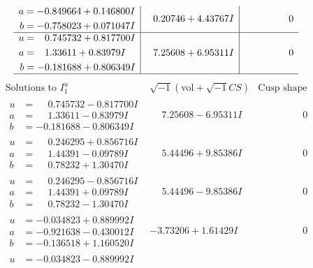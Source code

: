 \documentclass[1p]{elsarticle_modified}
\theoremstyle{definition}
\newcommand{\I}{\sqrt{-1}}
\begin{document}
$$\begin{array}{c|c|c}
\begin{aligned}
a &= -0.849664 + 0.146800 I \\
b &= -0.758023 + 0.071047 I\end{aligned}
 & \phantom{-}0.20746 + 4.43767 I & \phantom{-0.000000 } 0 \\ \hline\begin{aligned}
u &= \phantom{-}0.745732 + 0.817700 I \\
a &= \phantom{-}1.33611 + 0.83979 I \\
b &= -0.181688 + 0.806349 I\end{aligned}
 & \phantom{-}7.25608 + 6.95311 I & \phantom{-0.000000 } 0\\
 \hline 
 \end{array}$$\newpage$$\begin{array}{c|c|c}  
\text{Solutions to }I^u_{1}& \I (\text{vol} + \sqrt{-1}CS) & \text{Cusp shape}\\
 \hline 
\begin{aligned}
u &= \phantom{-}0.745732 - 0.817700 I \\
a &= \phantom{-}1.33611 - 0.83979 I \\
b &= -0.181688 - 0.806349 I\end{aligned}
 & \phantom{-}7.25608 - 6.95311 I & \phantom{-0.000000 } 0 \\ \hline\begin{aligned}
u &= \phantom{-}0.246295 + 0.856716 I \\
a &= \phantom{-}1.44391 - 0.09789 I \\
b &= \phantom{-}0.78232 + 1.30470 I\end{aligned}
 & \phantom{-}5.44496 + 9.85386 I & \phantom{-0.000000 } 0 \\ \hline\begin{aligned}
u &= \phantom{-}0.246295 - 0.856716 I \\
a &= \phantom{-}1.44391 + 0.09789 I \\
b &= \phantom{-}0.78232 - 1.30470 I\end{aligned}
 & \phantom{-}5.44496 - 9.85386 I & \phantom{-0.000000 } 0 \\ \hline\begin{aligned}
u &= -0.034823 + 0.889992 I \\
a &= -0.921638 - 0.430012 I \\
b &= -0.136518 + 1.160520 I\end{aligned}
 & -3.73206 + 1.61429 I & \phantom{-0.000000 } 0 \\ \hline\begin{aligned}
u &= -0.034823 - 0.889992 I \\

\end{aligned}
\end{array}$$
\end{document}
